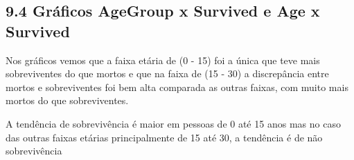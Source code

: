\documentclass[11pt]{article}
\begin{document}
    \begin{center}
    \end{center}
    { \hspace*{\fill} \\}
    
    \begin{center}
    \end{center}
    { \hspace*{\fill} \\}
    
    \begin{center}
    \end{center}
    { \hspace*{\fill} \\}
    
    \begin{center}
    \end{center}
    { \hspace*{\fill} \\}
    
    \begin{center}
    \end{center}
    { \hspace*{\fill} \\}
    
    \subsection{9.4 Gráficos AgeGroup x Survived e Age x
Survived}\label{gruxe1ficos-agegroup-x-survived-e-age-x-survived}

Nos gráficos vemos que a faixa etária de (0 - 15) foi a única que teve
mais sobreviventes do que mortos e que na faixa de (15 - 30) a
discrepância entre mortos e sobreviventes foi bem alta comparada as
outras faixas, com muito mais mortos do que sobreviventes.

A tendência de sobrevivência é maior em pessoas de 0 até 15 anos mas no
caso das outras faixas etárias principalmente de 15 até 30, a tendência
é de não sobrevivência
\end{document}
